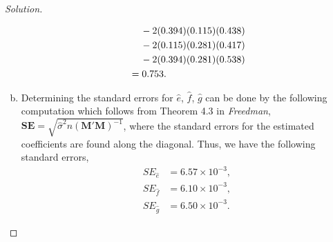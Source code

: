 \documentclass{amsart}
\newcommand{\bvec}[1]{{\boldsymbol #1}}
\begin{document}
\begin{proof}[Solution]
\begin{enumerate}[(a)]
\begin{align*}
								&\hspace*{12pt} - 2(0.394)(0.115)(0.438) \\
								&\hspace*{12pt} - 2(0.115)(0.281)(0.417) \\
								&\hspace*{12pt} - 2(0.394)(0.281)(0.538) \\
								&= 0.753.
							\end{align*}
						\item Determining the standard errors for $\hat{e}$, $\hat{f}$, $\hat{g}$ can be done by the following computation which follows from Theorem 4.3 in \textit{Freedman}, $\mathbf{SE} = \sqrt{\hat{\sigma}^{2}n(\bvec{M}'\bvec{M})^{-1}}$, where the standard errors for the estimated coefficients are found along the diagonal.
						Thus, we have the following standard errors,
							\begin{align*}
								SE_{\hat{e}} &= 6.57 \times 10^{-3}, \\
								SE_{\hat{f}} &= 6.10 \times 10^{-3}, \\
								SE_{\hat{g}} &= 6.50 \times 10^{-3}.
							\end{align*}
				\end{enumerate}
			\end{proof}
\end{document}
